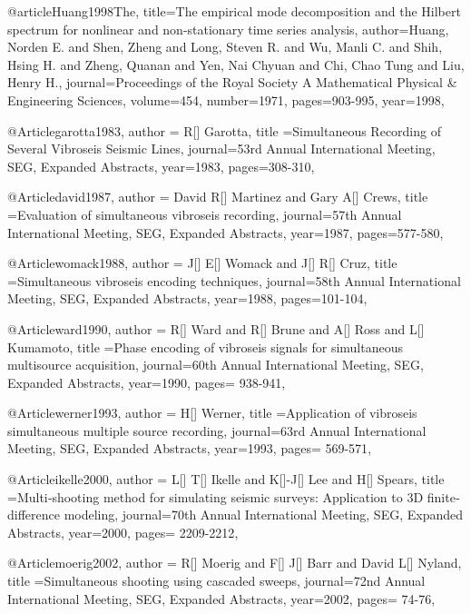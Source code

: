{@article{Huang1998The,
  title={The empirical mode decomposition and the Hilbert spectrum for nonlinear and non-stationary time series analysis},
  author={Huang, Norden E. and Shen, Zheng and Long, Steven R. and Wu, Manli C. and Shih, Hsing H. and Zheng, Quanan and Yen, Nai Chyuan and Chi, Chao Tung and Liu, Henry H.},
  journal={Proceedings of the Royal Society A Mathematical Physical \& Engineering Sciences},
  volume={454},
  number={1971},
  pages={903-995},
  year={1998},
}


@Article{garotta1983,
  author = {R[] Garotta},
  title ={Simultaneous Recording of Several Vibroseis Seismic Lines},
  journal={53rd Annual International Meeting, SEG, Expanded Abstracts},
  year=1983,
  pages={308-310},
}

@Article{david1987,
  author = {David R[] Martinez and Gary A[] Crews},
  title ={Evaluation of simultaneous vibroseis recording},
  journal={57th Annual International Meeting, SEG, Expanded Abstracts},
  year=1987,
  pages={577-580},
}

@Article{womack1988,
  author = {J[] E[] Womack and J[] R[] Cruz},
  title ={Simultaneous vibroseis encoding techniques},
  journal={58th Annual International Meeting, SEG, Expanded Abstracts},
  year=1988,
  pages={101-104},
}

@Article{ward1990,
  author = {R[] Ward and R[] Brune and A[] Ross and L[] Kumamoto},
  title ={Phase encoding of vibroseis signals for simultaneous multisource acquisition},
  journal={60th Annual International Meeting, SEG, Expanded Abstracts},
  year=1990,
  pages={ 938-941},
}

@Article{werner1993,
  author = {H[] Werner},
  title ={Application of vibroseis simultaneous multiple source recording},
  journal={63rd Annual International Meeting, SEG, Expanded Abstracts},
  year=1993,
  pages={ 569-571},
}

@Article{ikelle2000,
  author = {L[] T[] Ikelle and K[]-J[] Lee and H[] Spears},
  title ={Multi‐shooting method for simulating seismic surveys: Application to 3{D} finite‐difference modeling},
  journal={70th Annual International Meeting, SEG, Expanded Abstracts},
  year=2000,
  pages={ 2209-2212},
}

@Article{moerig2002,
  author = {R[] Moerig and F[] J[] Barr and David L[] Nyland},
  title ={Simultaneous shooting using cascaded sweeps},
  journal={72nd Annual International Meeting, SEG, Expanded Abstracts},
  year=2002,
  pages={ 74-76},
}





}

